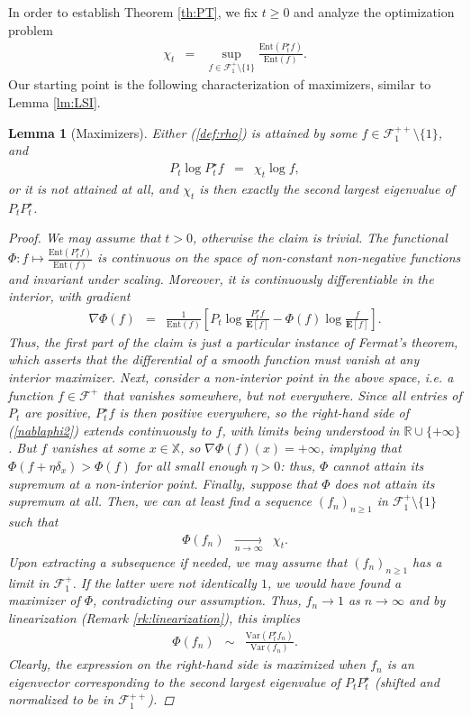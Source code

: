 \documentclass[12pt,final]{article}
\newtheorem{lemma}{Lemma}[section]
\numberwithin{equation}{section}
\newcommand{\dR}{\mathbb {R}}
\newcommand{\bE}{{\mathbf{E}}}
\newcommand{\Ent}{\mathrm{Ent}}
\newcommand{\Var}{\mathrm{Var}}
\newcommand{\cF}{\mathcal {F}}
\newcommand{\dX}{\mathbb{X}}
\begin{document}
In order to establish Theorem \ref{th:PT}, we fix $t\ge 0$ and analyze the optimization problem
\begin{eqnarray}
\label{def:rho}
\chi_t & = & \sup_{f\in\cF^+_1\setminus\{1\}}\frac{\Ent(P_t^\star f)}{\Ent(f)}.
\end{eqnarray}
Our starting point is the following characterization of maximizers,  similar to  Lemma \ref{lm:LSI}.
\begin{lemma}[Maximizers]\label{lm:optimizer}Either (\ref{def:rho}) is attained by some $f\in\cF^{++}_1\setminus\{1\}$, and
\begin{eqnarray}
\label{chi:local}
P_t \log {P_t^\star f} & = & \chi_t\log {f},
\end{eqnarray}
or it is not attained at all, and $\chi_t$ is then exactly the second largest eigenvalue of $P_tP_t^\star$.
\begin{proof}
We may assume that $t>0$, otherwise the claim is trivial.  The functional $\Phi\colon f\mapsto \frac{\Ent(P_t^\star f)}{\Ent(f)}$ is continuous on the space of non-constant non-negative functions and invariant under scaling. Moreover, it is continuously differentiable in the interior, with gradient
\begin{eqnarray}
\label{nablaphi2}
\nabla \Phi(f) & = & \frac{1}{\Ent(f)}\left[P_t\log \frac{P_t^\star f}{\bE[f]}-\Phi(f)\log \frac{f}{\bE[f]}\right].
\end{eqnarray}
Thus, the first part of the claim is just a particular instance of Fermat's theorem, which asserts that the differential of a smooth function must vanish at any interior maximizer. Next, consider a non-interior point in the above space, i.e. a function $f\in\cF^+$ that vanishes somewhere, but not everywhere. Since all entries of $P_t$ are positive,  $P_t^\star f$ is then positive everywhere, so  the right-hand side of (\ref{nablaphi2}) extends continuously to $f$, with limits being understood in $\dR\cup\{+\infty\}$. But $f$ vanishes at some $x\in\dX$, so $\nabla \Phi(f)(x)=+\infty$, implying that $\Phi(f+\eta\delta_x)>\Phi(f)$ for all small enough $\eta>0$: thus, $\Phi$ cannot attain its supremum at a non-interior point. Finally, suppose that $\Phi$ does not attain its supremum at all. Then, we can at least find a sequence $(f_n)_{n\ge 1}$ in $\cF_1^{+}\setminus\{1\}$ such that
\begin{eqnarray*}
\Phi(f_n) & \xrightarrow[n\to\infty]{} & \chi_t.
\end{eqnarray*} 
Upon extracting a subsequence if needed, we may assume that $(f_n)_{n\ge 1}$ has a limit in $\cF_1^+$. If the latter were not identically $1$, we would have found a maximizer of $\Phi$, contradicting our assumption. Thus, $f_n\to 1$ as $n\to\infty$ and by linearization (Remark \ref{rk:linearization}), this implies  
\begin{eqnarray*}
\Phi(f_n) & \sim & \frac{\Var(P_t^\star f_n)}{\Var(f_n)}.
\end{eqnarray*}
Clearly, the expression on the right-hand side is maximized when $f_n$ is an eigenvector corresponding to the second largest eigenvalue of $P_tP_t^\star$ (shifted  and normalized to be in $\cF_1^{++}$). 
\end{proof}
\end{lemma}
\end{document}
